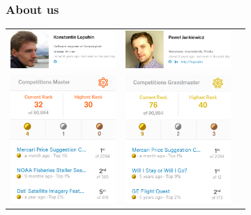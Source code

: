 \begin{frame}
\frametitle{About us}



\begin{tabular}{ c c c }
\includegraphics[width=4cm]{img/about_kl_photo.png} & \includegraphics[width=4cm]{img/about_pj_photo.png}  \\
\includegraphics[width=4cm]{img/about_kl_results.png} & \includegraphics[width=4cm]{img/about_pj_results.png}
\end{tabular}

\end{frame}